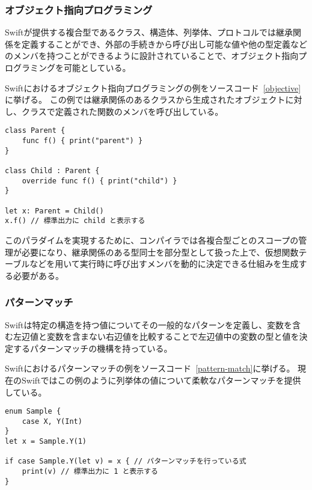 \subsubsection{オブジェクト指向プログラミング}

Swiftが提供する複合型であるクラス、構造体、列挙体、プロトコルでは継承関係を定義することができ、外部の手続きから呼び出し可能な値や他の型定義などのメンバを持つことができるように設計されていることで、オブジェクト指向プログラミングを可能としている。

Swiftにおけるオブジェクト指向プログラミングの例をソースコード~\ref{objective}に挙げる。
この例では継承関係のあるクラスから生成されたオブジェクトに対し、クラスで定義された関数のメンバを呼び出している。

\begin{lstlisting}[caption=Swiftにおけるオブジェクト指向プログラミングの例, label=objective]
class Parent {
    func f() { print("parent") }
}

class Child : Parent {
    override func f() { print("child") }
}

let x: Parent = Child()
x.f() // 標準出力に child と表示する
\end{lstlisting}

このパラダイムを実現するために、コンパイラでは各複合型ごとのスコープの管理が必要になり、継承関係のある型同士を部分型として扱った上で、仮想関数テーブルなどを用いて実行時に呼び出すメンバを動的に決定できる仕組みを生成する必要がある。

\subsubsection{パターンマッチ}

Swiftは特定の構造を持つ値についてその一般的なパターンを定義し、変数を含む左辺値と変数を含まない右辺値を比較することで左辺値中の変数の型と値を決定するパターンマッチの機構を持っている。

Swiftにおけるパターンマッチの例をソースコード~\ref{pattern-match}に挙げる。
現在のSwiftではこの例のように列挙体の値について柔軟なパターンマッチを提供している。

\begin{lstlisting}[caption=Swiftにおけるパターンマッチの例, label=pattern-match]
enum Sample {
    case X, Y(Int)
}
let x = Sample.Y(1)

if case Sample.Y(let v) = x { // パターンマッチを行っている式
    print(v) // 標準出力に 1 と表示する
}
\end{lstlisting}

